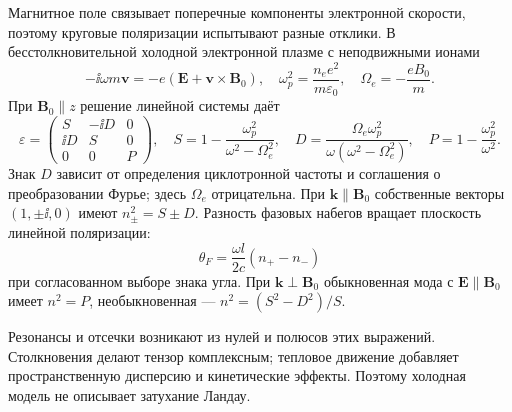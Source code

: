 
Магнитное поле связывает поперечные компоненты электронной скорости, поэтому круговые поляризации испытывают разные отклики. В бесстолкновительной холодной электронной плазме с неподвижными ионами
\begin{equation}
 -\ii\omega m\bm v=-e(\bm E+\bm v\times\bm B_0),\quad
 \omega_p^2=\frac{n_ee^2}{m\varepsilon_0},\quad \Omega_e=-\frac{eB_0}{m}.
\end{equation}
При $\bm B_0\parallel z$ решение линейной системы даёт
\begin{equation}
 \varepsilon=\begin{pmatrix}S&-\ii D&0\\\ii D&S&0\\0&0&P\end{pmatrix},\quad
 S=1-\frac{\omega_p^2}{\omega^2-\Omega_e^2},\quad
 D=\frac{\Omega_e\omega_p^2}{\omega(\omega^2-\Omega_e^2)},\quad
 P=1-\frac{\omega_p^2}{\omega^2}.
\end{equation}
Знак $D$ зависит от определения циклотронной частоты и соглашения о преобразовании Фурье; здесь $\Omega_e$ отрицательна. При $\bm k\parallel\bm B_0$ собственные векторы $(1,\pm\ii,0)$ имеют $n_\pm^2=S\pm D$. Разность фазовых набегов вращает плоскость линейной поляризации:
\begin{equation}
 \theta_F=\frac{\omega l}{2c}(n_+-n_-)
\end{equation}
при согласованном выборе знака угла. При $\bm k\perp\bm B_0$ обыкновенная мода с $\bm E\parallel\bm B_0$ имеет $n^2=P$, необыкновенная — $n^2=(S^2-D^2)/S$.

Резонансы и отсечки возникают из нулей и полюсов этих выражений. Столкновения делают тензор комплексным; тепловое движение добавляет пространственную дисперсию и кинетические эффекты. Поэтому холодная модель не описывает затухание Ландау.
